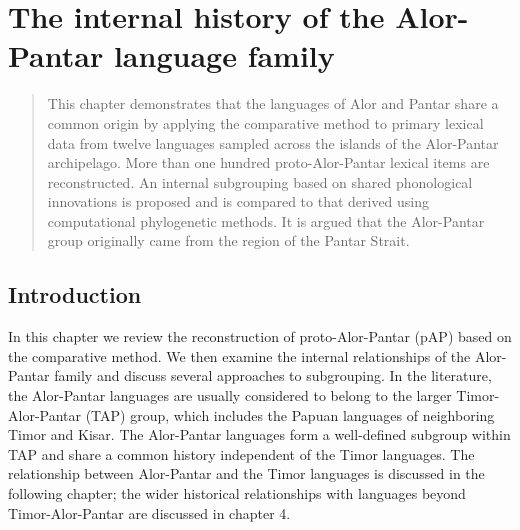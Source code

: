 
\chapter{The internal history of the Alor-Pantar language family}

\begin{abstract}
This chapter demonstrates that the languages of Alor and Pantar share a common origin by applying the comparative method to primary lexical data from twelve languages sampled across the islands of the Alor-Pantar archipelago. More than one hundred proto-Alor-Pantar lexical items are reconstructed. An internal subgrouping based on shared phonological innovations is proposed and is compared to that derived using computational phylogenetic methods. It is argued that the Alor-Pantar group originally came from the region of the Pantar Strait.
\end{abstract}

\section{Introduction}
\hypertarget{Toc376957608}{}
In this chapter we review the reconstruction of proto-Alor-Pantar (pAP) based on the comparative method. We then examine the internal relationships of the Alor-Pantar family and discuss several approaches to subgrouping. In the literature, the Alor-Pantar languages are usually considered to belong to the larger Timor-Alor-Pantar (TAP) group, which includes the Papuan languages of neighboring Timor and Kisar. The Alor-Pantar languages form a well-defined subgroup within TAP and share a common history independent of the Timor languages. The relationship between Alor-Pantar and the Timor languages is discussed in the following chapter; the wider historical relationships with languages beyond Timor-Alor-Pantar are discussed in chapter 4. 

